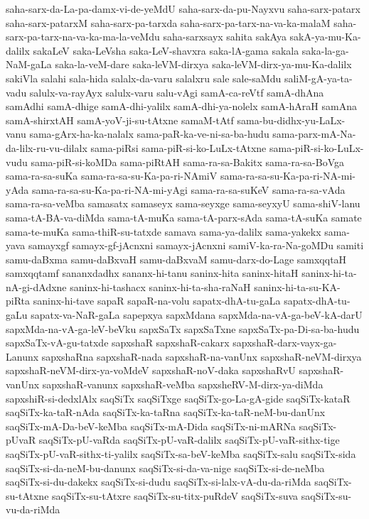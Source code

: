 {saha-sarx-da-La-pa-damx-vi-de-yeMdU
saha-sarx-da-pu-Nayxvu
saha-sarx-patarx
saha-sarx-patarxM
saha-sarx-pa-tarxda
saha-sarx-pa-tarx-na-va-ka-malaM
saha-sarx-pa-tarx-na-va-ka-ma-la-veMdu
saha-sarxsayx
sahita
sakAya
sakA-ya-mu-Ka-dalilx
sakaLeV
saka-LeVsha
saka-LeV-shavxra
saka-lA-gama
sakala
saka-la-ga-NaM-gaLa
saka-la-veM-dare
saka-leVM-dirxya
saka-leVM-dirx-ya-mu-Ka-dalilx
sakiVla
salahi
sala-hida
salalx-da-varu
salalxru
sale
sale-saMdu
saliM-gA-ya-ta-vadu
salulx-va-rayAyx
salulx-varu
salu-vAgi
samA-ca-reVtf
samA-dhAna
samAdhi
samA-dhige
samA-dhi-yalilx
samA-dhi-ya-nolelx
samA-hAraH
samAna
samA-shirxtAH
samA-yoV-ji-su-tAtxne
samaM-tAtf
sama-bu-didhx-yu-LaLx-vanu
sama-gArx-ha-ka-nalalx
sama-paR-ka-ve-ni-sa-ba-hudu
sama-parx-mA-Na-da-lilx-ru-vu-dilalx
sama-piRsi
sama-piR-si-ko-LuLx-tAtxne
sama-piR-si-ko-LuLx-vudu
sama-piR-si-koMDa
sama-piRtAH
sama-ra-sa-Bakitx
sama-ra-sa-BoVga
sama-ra-sa-suKa
sama-ra-sa-su-Ka-pa-ri-NAmiV
sama-ra-sa-su-Ka-pa-ri-NA-mi-yAda
sama-ra-sa-su-Ka-pa-ri-NA-mi-yAgi
sama-ra-sa-suKeV
sama-ra-sa-vAda
sama-ra-sa-veMba
samasatx
samaseyx
sama-seyxge
sama-seyxyU
sama-shiV-lanu
sama-tA-BA-va-diMda
sama-tA-muKa
sama-tA-parx-sAda
sama-tA-suKa
samate
sama-te-muKa
sama-thiR-su-tatxde
samava
sama-ya-dalilx
sama-yakekx
sama-yava
samayxgf
samayx-gf-jAcnxni
samayx-jAcnxni
samiV-ka-ra-Na-goMDu
samiti
samu-daBxma
samu-daBxvaH
samu-daBxvaM
samu-darx-do-Lage
samxqqtaH
samxqqtamf
sananxdadhx
sananx-hi-tanu
saninx-hita
saninx-hitaH
saninx-hi-ta-nA-gi-dAdxne
saninx-hi-tashacx
saninx-hi-ta-sha-raNaH
saninx-hi-ta-su-KA-piRta
saninx-hi-tave
sapaR
sapaR-na-volu
sapatx-dhA-tu-gaLa
sapatx-dhA-tu-gaLu
sapatx-va-NaR-gaLa
sapepxya
sapxMdana
sapxMda-na-vA-ga-beV-kA-darU
sapxMda-na-vA-ga-leV-beVku
sapxSaTx
sapxSaTxne
sapxSaTx-pa-Di-sa-ba-hudu
sapxSaTx-vA-gu-tatxde
sapxshaR
sapxshaR-cakarx
sapxshaR-darx-vayx-ga-Lanunx
sapxshaRna
sapxshaR-nada
sapxshaR-na-vanUnx
sapxshaR-neVM-dirxya
sapxshaR-neVM-dirx-ya-voMdeV
sapxshaR-noV-daka
sapxshaRvU
sapxshaR-vanUnx
sapxshaR-vanunx
sapxshaR-veMba
sapxsheRV-M-dirx-ya-diMda
sapxshiR-si-dedxlAlx
saqSiTx
saqSiTxge
saqSiTx-go-La-gA-gide
saqSiTx-kataR
saqSiTx-ka-taR-nAda
saqSiTx-ka-taRna
saqSiTx-ka-taR-neM-bu-danUnx
saqSiTx-mA-Da-beV-keMba
saqSiTx-mA-Dida
saqSiTx-ni-mARNa
saqSiTx-pUvaR
saqSiTx-pU-vaRda
saqSiTx-pU-vaR-dalilx
saqSiTx-pU-vaR-sithx-tige
saqSiTx-pU-vaR-sithx-ti-yalilx
saqSiTx-sa-beV-keMba
saqSiTx-salu
saqSiTx-sida
saqSiTx-si-da-neM-bu-danunx
saqSiTx-si-da-va-nige
saqSiTx-si-de-neMba
saqSiTx-si-du-dakekx
saqSiTx-si-dudu
saqSiTx-si-lalx-vA-du-da-riMda
saqSiTx-su-tAtxne
saqSiTx-su-tAtxre
saqSiTx-su-titx-puRdeV
saqSiTx-suva
saqSiTx-su-vu-da-riMda
}
